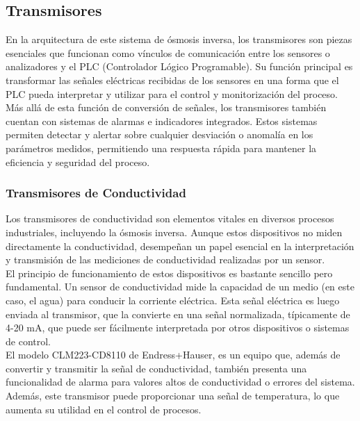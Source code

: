 
\subsection{Transmisores}

En la arquitectura de este sistema de ósmosis inversa, los transmisores son piezas esenciales que funcionan como vínculos de
comunicación entre los sensores o analizadores y el PLC (Controlador Lógico Programable). 
Su función principal es transformar las señales eléctricas recibidas de los sensores en una forma que el 
PLC pueda interpretar y utilizar para el control y monitorización del proceso. \\

Más allá de esta función de conversión de señales, los transmisores también cuentan con sistemas de alarmas e indicadores 
integrados. Estos sistemas permiten detectar y alertar sobre cualquier desviación o
anomalía en los parámetros medidos, permitiendo una respuesta rápida para mantener la eficiencia y seguridad del proceso. \\

\subsubsection{Transmisores de Conductividad }

Los transmisores de conductividad son elementos vitales en diversos procesos industriales, incluyendo la ósmosis inversa. Aunque estos dispositivos no miden directamente la conductividad, desempeñan un papel esencial en la interpretación y transmisión de las mediciones de conductividad realizadas por un sensor.\\

El principio de funcionamiento de estos dispositivos es bastante sencillo pero fundamental. Un sensor de conductividad mide la capacidad de un medio (en este caso, el agua) para conducir la corriente eléctrica. Esta señal eléctrica es luego enviada al transmisor, que la convierte en una señal normalizada, típicamente de 4-20 mA, que puede ser fácilmente interpretada por otros dispositivos o sistemas de control.\\

El modelo CLM223-CD8110 de Endress+Hauser, es un equipo que, además de convertir y transmitir la señal de conductividad, también presenta una funcionalidad de alarma para valores altos de conductividad o errores del sistema. Además, este transmisor puede proporcionar una señal de temperatura, lo que aumenta su utilidad en el control de procesos.\\

